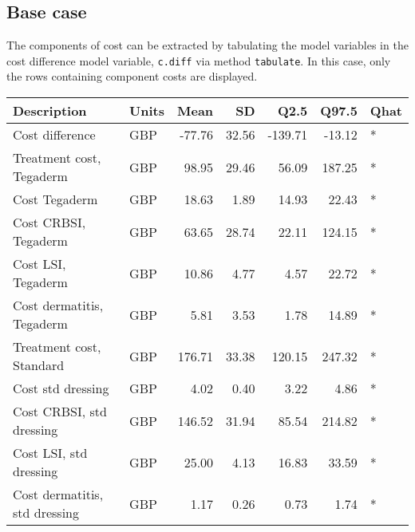 \documentclass[]{article}
\newenvironment{Shaded}{\begin{snugshade}}{\end{snugshade}}
\newcommand{\CommentTok}[1]{\textcolor[rgb]{0.56,0.35,0.01}{\textit{#1}}}
\newcommand{\KeywordTok}[1]{\textcolor[rgb]{0.13,0.29,0.53}{\textbf{#1}}}
\newcommand{\NormalTok}[1]{#1}
\newcommand{\OperatorTok}[1]{\textcolor[rgb]{0.81,0.36,0.00}{\textbf{#1}}}
\newcommand{\StringTok}[1]{\textcolor[rgb]{0.31,0.60,0.02}{#1}}
\begin{document}
\begin{Shaded}
\end{Shaded}

\hypertarget{base-case-1}{%
\subsection{Base case}\label{base-case-1}}

The components of cost can be extracted by tabulating the model
variables in the cost difference model variable, \texttt{c.diff} via
method \texttt{tabulate}. In this case, only the rows containing
component costs are displayed.

\begin{longtable}[]{@{}llrrrrl@{}}
\toprule
Description & Units & Mean & SD & Q2.5 & Q97.5 & Qhat\tabularnewline
\midrule
\endhead
Cost difference & GBP & -77.76 & 32.56 & -139.71 & -13.12 &
*\tabularnewline
Treatment cost, Tegaderm & GBP & 98.95 & 29.46 & 56.09 & 187.25 &
*\tabularnewline
Cost Tegaderm & GBP & 18.63 & 1.89 & 14.93 & 22.43 & *\tabularnewline
Cost CRBSI, Tegaderm & GBP & 63.65 & 28.74 & 22.11 & 124.15 &
*\tabularnewline
Cost LSI, Tegaderm & GBP & 10.86 & 4.77 & 4.57 & 22.72 &
*\tabularnewline
Cost dermatitis, Tegaderm & GBP & 5.81 & 3.53 & 1.78 & 14.89 &
*\tabularnewline
Treatment cost, Standard & GBP & 176.71 & 33.38 & 120.15 & 247.32 &
*\tabularnewline
Cost std dressing & GBP & 4.02 & 0.40 & 3.22 & 4.86 & *\tabularnewline
Cost CRBSI, std dressing & GBP & 146.52 & 31.94 & 85.54 & 214.82 &
*\tabularnewline
Cost LSI, std dressing & GBP & 25.00 & 4.13 & 16.83 & 33.59 &
*\tabularnewline
Cost dermatitis, std dressing & GBP & 1.17 & 0.26 & 0.73 & 1.74 &
*\tabularnewline
\bottomrule
\end{longtable}
\end{document}
